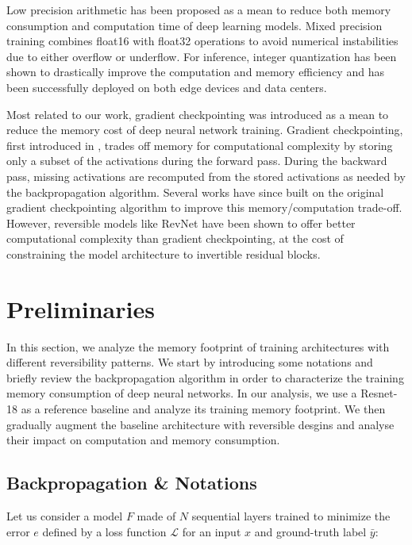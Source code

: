 \documentclass[twocolumn]{bmcart}
\begin{document}
Low precision arithmetic has been proposed as a mean to reduce both memory consumption and computation time of deep learning models. Mixed precision training \cite{micikevicius2017mixed} combines float16 with float32 operations to avoid numerical instabilities due to either overflow or underflow.
For inference,  integer quantization \cite{jacob2018quantization,wu2018training} has been shown to drastically improve the computation and memory efficiency and has been successfully deployed on both edge devices and data centers.

Most related to our work, gradient checkpointing was introduced as a mean to reduce the memory cost of deep neural network training.
Gradient checkpointing, first introduced in \cite{chen2016training}, trades off memory for computational complexity by storing only a subset of the activations during the forward pass.
During the backward pass, missing activations are recomputed from the stored activations as needed by the backpropagation algorithm.
Several works \cite{} have since built on the original gradient checkpointing algorithm to improve this memory/computation trade-off.  
However, reversible models like RevNet have been shown to offer better computational complexity than gradient checkpointing,
at the cost of constraining the model architecture to invertible residual blocks.

\section{Preliminaries}

In this section, we analyze the memory footprint of training architectures with different reversibility patterns.
We start by introducing some notations and briefly review the backpropagation algorithm
in order to characterize the training memory consumption of deep neural networks. 
In our analysis, we use a Resnet-18 as a reference baseline and analyze its training memory footprint.
We then gradually augment the baseline architecture with reversible desgins and analyse their impact on computation and memory consumption.

\subsection{Backpropagation \& Notations}

Let us consider a model $F$ made of $N$ sequential layers trained to minimize the error $e$ defined by a loss function $\mathcal{L}$ for an input $x$ and ground-truth label $\bar{y}$:
\end{document}
